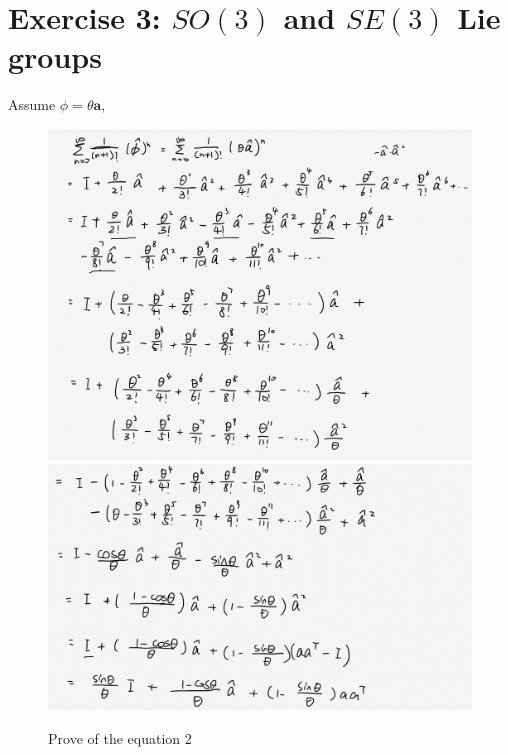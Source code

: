 \documentclass[12pt,letterpaper]{article}
\begin{document}
\section*{Exercise 3: $SO(3)$ and $SE(3)$ Lie groups}
Assume $\phi = \theta \bm{a}$,
\begin{figure}[hbt]
  \includegraphics[width=\textwidth]{images/eq1.png}
  \includegraphics[width=\textwidth]{images/eq2.png}
  \caption{Prove of the equation 2}
\end{figure}


\end{document}
